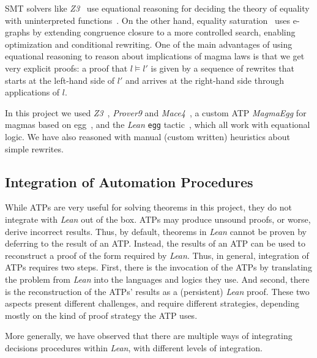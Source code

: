 SMT solvers like \emph{Z3}~\cite{DBLP:conf/tacas/MouraB08} use equational reasoning for deciding the theory of equality with uninterpreted functions~\cite{DBLP:series/txtcs/KroeningS16,DBLP:conf/cade/MouraB07}.
On the other hand, equality saturation~\cite{DBLP:journals/pacmpl/WillseyNWFTP21} uses e-graphs by extending congruence closure to a more controlled search, enabling optimization and conditional rewriting.
One of the main advantages of using equational reasoning to reason about implications of magma laws is that we get very explicit proofs: a proof that $l \models l'$ is given by a sequence of rewrites that starts at the left-hand side of $l'$ and arrives at the right-hand side through applications of $l$.

In this project we used \emph{Z3}~\cite{DBLP:conf/tacas/MouraB08}, \emph{Prover9} and \emph{Mace4}~\cite{prover9-mace4}, a custom ATP \emph{MagmaEgg} for magmas based on egg~\cite{DBLP:journals/pacmpl/WillseyNWFTP21}, and the \emph{Lean} \texttt{egg} tactic~\cite{DBLP:journals/pacmpl/KoehlerGBGTS24,rossel2024equality}, which all work with equational logic. We have also reasoned with manual (custom written) heuristics about simple rewrites.

\subsection{Integration of Automation Procedures}
\label{sec:proof-reconstruction}

While ATPs are very useful for solving theorems in this project, they do not integrate with \emph{Lean} out of the box.
ATPs may produce unsound proofs, or worse, derive incorrect results.
Thus, by default, theorems in \emph{Lean} cannot be proven by deferring to the result of an ATP.
Instead, the results of an ATP can be used to reconstruct a proof of the form required by \emph{Lean}.
Thus, in general, integration of ATPs requires two steps.
First, there is the invocation of the ATPs by translating the problem from \emph{Lean} into the languages and logics they use.
And second, there is the reconstruction of the ATPs' results as a (persistent) \emph{Lean} proof.
These two aspects present different challenges, and require different strategies, depending mostly on the kind of proof strategy the ATP uses.

More generally, we have observed that there are multiple ways of integrating decisions procedures within \emph{Lean}, with different levels of integration.

